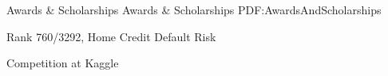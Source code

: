 \documentclass[letterpaper,MMMyyyy,nonstopmode]{simpleresumecv}
\begin{document}
\begin{Body}









\BigGap
\Section
{Awards \&\newline
Scholarships}
{Awards \& Scholarships}
{PDF:AwardsAndScholarships}

\BulletItem
Rank 760/3292, Home Credit Default Risk
\hfill
{}
\begin{Detail}
\Item
Competition at Kaggle
\end{Detail}



\end{Body}
\end{document}
